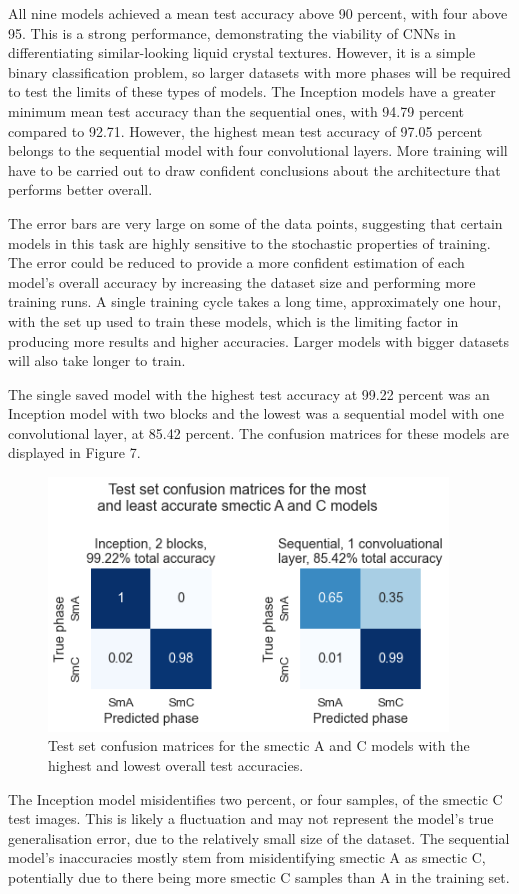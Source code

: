 \documentclass[12pt]{article}
\begin{document}
All nine models achieved a mean test accuracy above 90 percent, with four above 95. This is a strong performance, demonstrating the viability of CNNs in differentiating similar-looking liquid crystal textures. However, it is a simple binary classification problem, so larger datasets with more phases will be required to test the limits of these types of models. The Inception models have a greater minimum mean test accuracy than the sequential ones, with 94.79 percent compared to 92.71. However, the highest mean test accuracy of 97.05 percent belongs to the sequential model with four convolutional layers. More training will have to be carried out to draw confident conclusions about the architecture that performs better overall.

The error bars are very large on some of the data points, suggesting that certain models in this task are highly sensitive to the stochastic properties of training. The error could be reduced to provide a more confident estimation of each model's overall accuracy by increasing the dataset size and performing more training runs. A single training cycle takes a long time, approximately one hour, with the set up used to train these models, which is the limiting factor in producing more results and higher accuracies. Larger models with bigger datasets will also take longer to train.

The single saved model with the highest test accuracy at 99.22 percent was an Inception model with two blocks and the lowest was a sequential model with one convolutional layer, at 85.42 percent. The confusion matrices for these models are displayed in Figure 7.
\begin{figure}[!ht]
	\centering
    \includegraphics[width=4.174in]{images/confusion_matrix_2.png}
    \caption{Test set confusion matrices for the smectic A and C models with the highest and lowest overall test accuracies.}
\end{figure} 
The Inception model misidentifies two percent, or four samples, of the smectic C test images. This is likely a fluctuation and may not represent the model's true generalisation error, due to the relatively small size of the dataset. The sequential model's inaccuracies mostly stem from misidentifying smectic A as smectic C, potentially due to there being more smectic C samples than A in the training set. 
\end{document}
